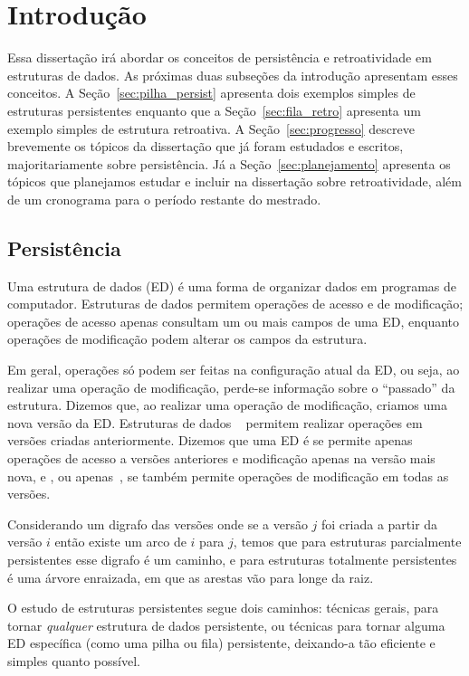 \documentclass[quali.tex]{subfile}
\begin{document}
\section{Introdução}

Essa dissertação irá abordar os conceitos de persistência e retroatividade em estruturas de dados. As próximas duas subseções da introdução apresentam esses conceitos. A Seção~\ref{sec:pilha_persist} apresenta dois exemplos simples de estruturas persistentes enquanto que a Seção~\ref{sec:fila_retro} apresenta um exemplo simples de estrutura retroativa. A Seção~\ref{sec:progresso} descreve brevemente os tópicos da dissertação que já foram estudados e escritos, majoritariamente sobre persistência. Já a Seção~\ref{sec:planejamento} apresenta os tópicos que planejamos estudar e incluir na dissertação sobre retroatividade, além de um cronograma para o período restante do mestrado.

\subsection{Persistência}

Uma estrutura de dados (ED) é uma forma de organizar dados em programas de computador. Estruturas de dados permitem operações de acesso e de modificação; operações de acesso apenas consultam um ou mais campos de uma ED, enquanto operações de modificação podem alterar os campos da estrutura.

Em geral, operações só podem ser feitas na configuração atual da ED, ou seja, ao realizar uma operação de modificação, perde-se informação sobre o ``passado'' da estrutura. Dizemos que, ao realizar uma operação de modificação, criamos uma nova versão da ED. Estruturas de dados ~\cite{DriscollSST1989} permitem realizar operações em versões criadas anteriormente. Dizemos que uma ED é  se permite apenas operações de acesso a versões anteriores e modificação apenas na versão mais nova, e , ou apenas~, se também permite operações de modificação em todas as versões.

Considerando um digrafo das versões onde se a versão $j$ foi criada a partir da versão $i$ então existe um arco de $i$ para $j$, temos que para estruturas parcialmente persistentes esse digrafo é um caminho, e para estruturas totalmente persistentes é uma árvore enraizada, em que as arestas vão para longe da raiz.

O estudo de estruturas persistentes segue dois caminhos: técnicas gerais, para tornar \emph{qualquer} estrutura de dados persistente, ou técnicas para tornar alguma ED específica (como uma pilha ou fila) persistente, deixando-a tão eficiente e simples quanto possível.
\end{document}

